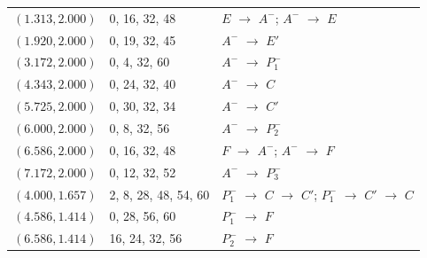 \documentclass[11pt]{article}
\theoremstyle{definition}
\theoremstyle{remark}
\begin{document}
{\begin{longtable}{l l l}
$(1.313, 2.000)$ & 0, 16, 32, 48 & $E$ $\to$ $A^{-}$; $A^{-}$ $\to$ $E$ \\
$(1.920, 2.000)$ & 0, 19, 32, 45 & $A^{-}$ $\to$ $E'$ \\
$(3.172, 2.000)$ & 0, 4, 32, 60 & $A^{-}$ $\to$ $P_1^{-}$ \\
$(4.343, 2.000)$ & 0, 24, 32, 40 & $A^{-}$ $\to$ $C$ \\
$(5.725, 2.000)$ & 0, 30, 32, 34 & $A^{-}$ $\to$ $C'$ \\
$(6.000, 2.000)$ & 0, 8, 32, 56 & $A^{-}$ $\to$ $P_2^{-}$ \\
$(6.586, 2.000)$ & 0, 16, 32, 48 & $F$ $\to$ $A^{-}$; $A^{-}$ $\to$ $F$ \\
$(7.172, 2.000)$ & 0, 12, 32, 52 & $A^{-}$ $\to$ $P_3^{-}$ \\
$(4.000, 1.657)$ & 2, 8, 28, 48, 54, 60 & $P_1^{-}$ $\to$ $C$ $\to$ $C'$; $P_1^{-}$ $\to$ $C'$ $\to$ $C$ \\
$(4.586, 1.414)$ & 0, 28, 56, 60 & $P_1^{-}$ $\to$ $F$ \\
$(6.586, 1.414)$ & 16, 24, 32, 56 & $P_2^{-}$ $\to$ $F$ \\
\bottomrule
\end{longtable}
}
\end{document}
